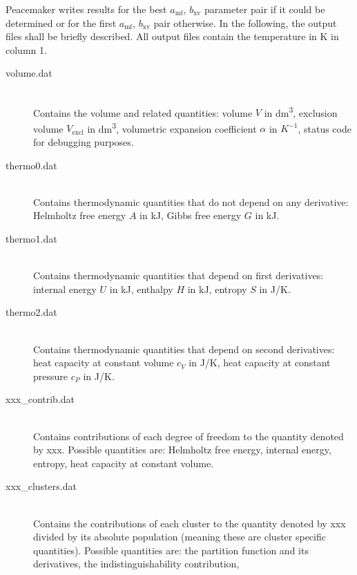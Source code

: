 \documentclass{scrartcl}
\newcommand{\amf}{a_\mathrm{mf}}
\newcommand{\bxv}{b_\mathrm{xv}}
\begin{document}
Peacemaker writes results for the best $\amf$, $\bxv$ parameter pair if it could be determined or for the first $\amf$, $\bxv$ pair otherwise.
In the following, the output files shall be briefly described.
All output files contain the temperature in \si{K} in column 1.

\begin{description}
    \item[volume.dat] \hfill \\
        Contains the volume and related quantities:
        volume $V$ in \si{dm^3}, exclusion volume $V_\mathrm{excl}$ in \si{dm^3}, volumetric expansion coefficient $\alpha$ in $\si{K^{-1}}$, status code for debugging purposes.
        \vspace{0.1cm}
    \item[thermo0.dat] \hfill \\
        Contains thermodynamic quantities that do not depend on any derivative:
        Helmholtz free energy $A$ in \si{kJ}, Gibbs free energy $G$ in \si{kJ}.
        \vspace{0.1cm}
    \item[thermo1.dat] \hfill \\
        Contains thermodynamic quantities that depend on first derivatives:
        internal energy $U$ in \si{kJ}, enthalpy $H$ in \si{kJ}, entropy $S$ in \si{J/K}.
        \vspace{0.1cm}
    \item[thermo2.dat] \hfill \\
        Contains thermodynamic quantities that depend on second derivatives:
        heat capacity at constant volume $c_V$ in \si{J/K}, heat capacity at constant pressure $c_P$ in \si{J/K}.
        \vspace{0.1cm}
    \item[xxx\_contrib.dat] \hfill \\
        Contains contributions of each degree of freedom to the quantity denoted by xxx.
        Possible quantities are: Helmholtz free energy, internal energy, entropy, heat capacity at constant volume.
        \vspace{0.1cm}
    \item[xxx\_clusters.dat] \hfill \\
        Contains the contributions of each cluster to the quantity denoted by xxx divided by its absolute 
        population (meaning these are cluster specific quantities).
        Possible quantities are: the partition function and its derivatives, the indistinguishability contribution, 

\end{description}
\end{document}
